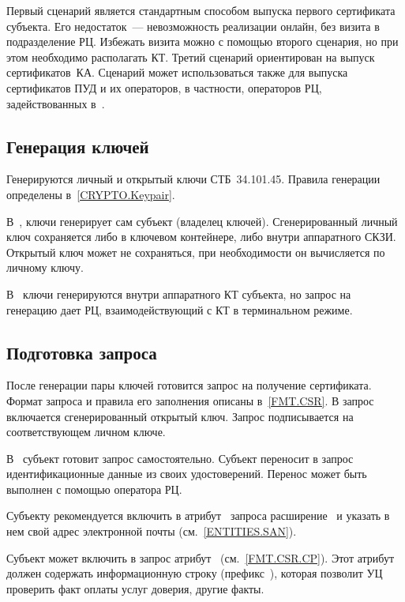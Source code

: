 Первый сценарий является стандартным способом выпуска первого сертификата
субъекта.  Его недостаток~--- невозможность реализации онлайн, без визита в
подразделение РЦ.
%
Избежать визита можно с помощью второго сценария, но при этом необходимо
располагать КТ.
%
Третий сценарий ориентирован на выпуск сертификатов~КА.
%
Сценарий может использоваться также для выпуска сертификатов ПУД и их
операторов, в частности, операторов РЦ, задействованных в~.

\subsection{Генерация ключей}\label{PROCESSES.Enroll.Gen}

Генерируются личный и открытый ключи СТБ~34.101.45.
Правила генерации определены в~\ref{CRYPTO.Keypair}.

В~,  ключи генерирует сам субъект (владелец 
ключей). Сгенерированный личный ключ сохраняется либо в ключевом 
контейнере, либо внутри аппаратного СКЗИ. Открытый ключ может не сохраняться, 
при необходимости он вычисляется по личному ключу.

В~ ключи генерируются внутри аппаратного КТ субъекта, но запрос на
генерацию дает РЦ, взаимодействующий с КТ в терминальном режиме.

\subsection{Подготовка запроса}\label{PROCESSES.Enroll.CSR}

После генерации пары ключей готовится запрос на получение сертификата. Формат
запроса и правила его заполнения описаны в~\ref{FMT.CSR}. В запрос включается
сгенерированный открытый ключ. Запрос подписывается на соответствующем личном
ключе.

В~ субъект готовит запрос самостоятельно. Субъект переносит в
запрос идентификационные данные из своих удостоверений. Перенос может быть
выполнен с помощью оператора РЦ.

Субъекту рекомендуется включить в атрибут~ запроса
расширение~ и указать в нем свой адрес электронной почты
(см.~\ref{ENTITIES.SAN}).

Субъект может включить в запрос атрибут~
(см.~\ref{FMT.CSR.CP}). Этот атрибут должен содержать информационную строку
(префикс~), которая позволит УЦ проверить факт оплаты услуг доверия,
другие факты.

